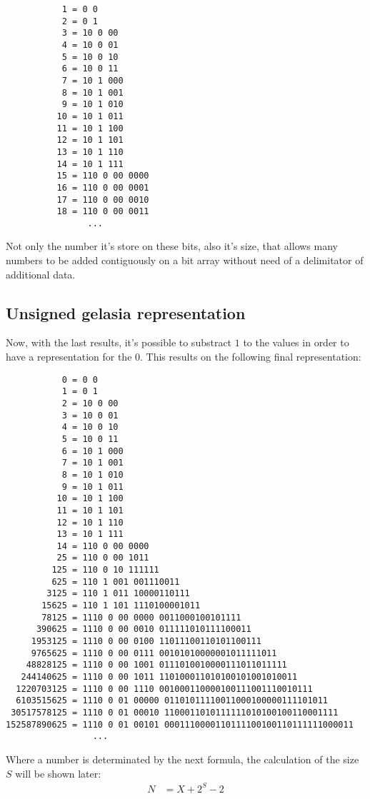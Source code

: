 \documentclass[a4paper,11pt]{article}
\begin{document}
\begin{center} \begin{lstlisting}
           1 = 0 0 
           2 = 0 1
           3 = 10 0 00
           4 = 10 0 01 
           5 = 10 0 10 
           6 = 10 0 11 
           7 = 10 1 000 
           8 = 10 1 001 
           9 = 10 1 010 
          10 = 10 1 011 
          11 = 10 1 100 
          12 = 10 1 101 
          13 = 10 1 110 
          14 = 10 1 111 
          15 = 110 0 00 0000 
          16 = 110 0 00 0001 
          17 = 110 0 00 0010 
          18 = 110 0 00 0011 
	      		...	
\end{lstlisting} \end{center}
Not only the number it's store on these bits, also it's size, that allows many numbers to be added contiguously on a bit array without need of a delimitator of additional data.
\subsection{Unsigned gelasia representation}
Now, with the last results, it's possible to substract $1$ to the values in order to have a representation for the $0$. This results on the following final representation:
\begin{center} \begin{lstlisting}
           0 = 0 0 
           1 = 0 1
           2 = 10 0 00
           3 = 10 0 01 
           4 = 10 0 10 
           5 = 10 0 11 
           6 = 10 1 000 
           7 = 10 1 001 
           8 = 10 1 010 
           9 = 10 1 011 
          10 = 10 1 100 
          11 = 10 1 101 
          12 = 10 1 110 
          13 = 10 1 111 
          14 = 110 0 00 0000
          25 = 110 0 00 1011 
         125 = 110 0 10 111111 
         625 = 110 1 001 001110011 
        3125 = 110 1 011 10000110111 
       15625 = 110 1 101 1110100001011 
       78125 = 1110 0 00 0000 0011000100101111 
      390625 = 1110 0 00 0010 011111010111100011 
     1953125 = 1110 0 00 0100 11011100110101100111 
     9765625 = 1110 0 00 0111 00101010000001011111011 
    48828125 = 1110 0 00 1001 0111010010000111011011111 
   244140625 = 1110 0 00 1011 110100011010100101001010011 
  1220703125 = 1110 0 00 1110 001000110000100111001110010111 
  6103515625 = 1110 0 01 00000 01101011110011000100000111101011 
 30517578125 = 1110 0 01 00010 1100011010111111010100100110001111 
152587890625 = 1110 0 01 00101 0001110000110111100100110111111000011
	             ...	
\end{lstlisting} \end{center}
Where a number is determinated by the next formula, the calculation of the size $S$ will be shown later:
\begin{align*}
	N &= X+2^{S}-2
\end{align*}
\end{document}
